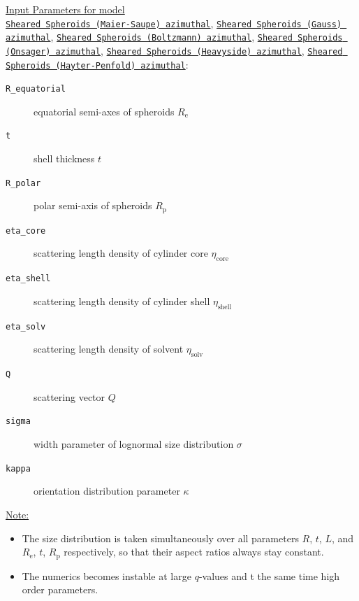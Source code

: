 \underline{Input Parameters for model}\\ \underline{\texttt{Sheared Spheroids (Maier-Saupe) azimuthal}}, \underline{\texttt{Sheared Spheroids (Gauss) azimuthal}}, \underline{\texttt{Sheared Spheroids (Boltzmann) azimuthal}}, \underline{\texttt{Sheared Spheroids (Onsager) azimuthal}}, \underline{\texttt{Sheared Spheroids (Heavyside) azimuthal}}, \underline{\texttt{Sheared Spheroids (Hayter-Penfold) azimuthal}}:\\
\begin{description}
\item[\texttt{R\_equatorial}] equatorial semi-axes of spheroids $R_\mathrm{e}$
\item[\texttt{t}] shell thickness $t$
\item[\texttt{R\_polar}] polar semi-axis of spheroids $R_\mathrm{p}$
\item[\texttt{eta\_core}] scattering length density of cylinder core $\eta_\mathrm{core}$
\item[\texttt{eta\_shell}] scattering length density of cylinder shell $\eta_\mathrm{shell}$
\item[\texttt{eta\_solv}] scattering length density of solvent $\eta_\mathrm{solv}$
\item[\texttt{Q}] scattering vector $Q$
\item[{\texttt{sigma}}] width parameter of lognormal size distribution $\sigma$
\item[{\texttt{kappa}}] orientation distribution parameter $\kappa$
\end{description}

\vspace{5mm}

\noindent \underline{Note:}
\begin{itemize}
\item The size distribution is taken simultaneously over all parameters $R$, $t$, $L$, and $R_\mathrm{e}$, $t$, $R_\mathrm{p}$ respectively, so that their aspect ratios always stay constant.
\item The numerics becomes instable at large $q$-values and t the same time high order parameters.
\end{itemize}
